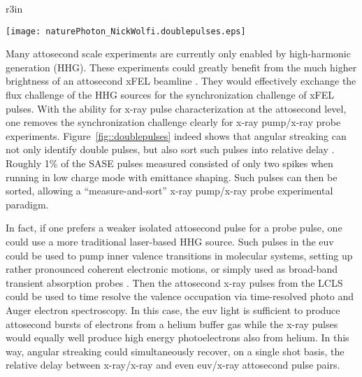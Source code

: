 \begin{wrapfigure}[9]{r}{3in}
\vspace{-3\baselineskip}
\centerline{\texttt{[image: naturePhoton\_NickWolfi.doublepulses.eps]}}
\vspace{-0.5\baselineskip}
\caption{\label{fig::doublepulses}Reproduced from Ref.~\cite{Nick2018}.
}
\end{wrapfigure}
Many attosecond scale experiments are currently only enabled by high-harmonic generation (HHG)\cite{Lewenstein1994,Hentschel2001,Chen2014,Biegert2014,Schmidt2016,Biegert2016,WornerSci2017,Zenghu2017}.
These experiments could greatly benefit from the much higher brightness of an attosecond xFEL beamline \cite{Ding2009,Xiang2009,xLEAP}.
They would effectively exchange the flux challenge of the HHG sources for the synchronization challenge of xFEL pulses.
With the ability for x-ray pulse characterization at the attosecond level, one removes the synchronization challenge clearly for x-ray pump/x-ray probe experiments.
Figure~\ref{fig::doublepulses} indeed shows that angular streaking can not only identify double pulses, but also sort such pulses into relative delay \cite{Nick2018}.
Roughly 1\% of the SASE pulses measured consisted of only two spikes when running in low charge mode with emittance shaping.
Such pulses can then be sorted, allowing a ``measure-and-sort'' x-ray pump/x-ray probe experimental paradigm.

In fact, if one prefers a weaker isolated attosecond pulse for a probe pulse, one could use a more traditional laser-based HHG source.
Such pulses in the euv could be used to pump inner valence transitions in molecular systems, setting up rather pronounced coherent electronic motions, or simply used as broad-band transient absorption probes \cite{Biegert2016}.
Then the attosecond x-ray pulses from the LCLS could be used to time resolve the valence occupation via time-resolved photo and Auger electron spectroscopy.
In this case, the euv light is sufficient to produce attosecond bursts of electrons from a helium buffer gas while the x-ray pulses would equally well produce high energy photoelectrons also from helium.
In this way, angular streaking could simultaneously recover, on a single shot basis, the relative delay between x-ray/x-ray and even euv/x-ray attosecond pulse pairs.

